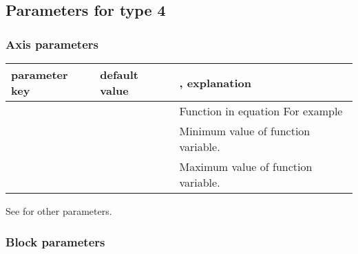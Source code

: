 \documentclass[a4paper,11pt,english]{sphinxmanual}
\begin{document}
\subsection{Parameters for type 4}
\label{\detokenize{types/types:parameters-for-type-4}}

\subsubsection{Axis parameters}
\label{\detokenize{types/types:id14}}

\begin{savenotes}\sphinxattablestart
\centering
{}
\sphinxthecaptionisattop
{}\label{\detokenize{types/types:id58}}
\sphinxaftertopcaption
\begin{tabulary}{\linewidth}[t]{|p{4cm}|p{4cm}|p{7cm}|}
\hline
\sphinxstyletheadfamily 
parameter key
&\sphinxstyletheadfamily 
default value
&\sphinxstyletheadfamily 
{}, explanation
\\
\hline
{}
&
\textendash{}
&
 Function in equation For example 
\\
\hline
{}
&
\textendash{}
&
 Minimum value of function variable.
\\
\hline
{}
&
\textendash{}
&
 Maximum value of function variable.
\\
\hline
\end{tabulary}
\par
\sphinxattableend\end{savenotes}

See {\hyperref[\detokenize{axes/axes:common-axis-params}]{}} for other parameters.


\subsubsection{Block parameters}
\label{\detokenize{types/types:id15}}
\end{document}
